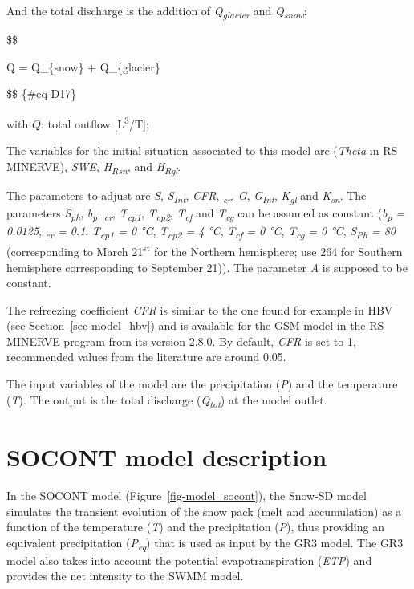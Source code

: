 \documentclass[
  letterpaper,
  DIV=11,
  numbers=noendperiod]{scrreprt}
\begin{document}
And the total discharge is the addition of
\emph{Q\textsubscript{glacier}} and \emph{Q\textsubscript{snow}}:

\$\$

Q = Q\_\{snow\} + Q\_\{glacier\}

\$\$ \{\#eq-D17\}

with \(Q\): total outflow {[}L\textsuperscript{3}/T{]};

The variables for the initial situation associated to this model are
\theta (\emph{Theta} in RS MINERVE), \emph{SWE},
\emph{H\textsubscript{Rsn}}, and \emph{H\textsubscript{Rgl}}.

The parameters to adjust are \emph{S}, \emph{S\textsubscript{Int}},
\emph{CFR}, \emph{\theta\textsubscript{cr}}, \emph{G},
\emph{G\textsubscript{Int}}, \emph{K\textsubscript{gl}} and
\emph{K\textsubscript{sn}}. The parameters \emph{S\textsubscript{ph}},
\emph{b\textsubscript{p}}, \emph{\theta\textsubscript{cr}},
\emph{T\textsubscript{cp1}}, \emph{T\textsubscript{cp2}},
\emph{T\textsubscript{cf}} and \emph{T\textsubscript{cg}} can be assumed
as constant (\emph{b\textsubscript{p} = 0.0125},
\emph{\theta\textsubscript{cr} = 0.1}, \emph{T\textsubscript{cp1} = 0
°C}, \emph{T\textsubscript{cp2} = 4 °C}, \emph{T\textsubscript{cf} = 0
°C}, \emph{T\textsubscript{cg} = 0 °C}, \emph{S\textsubscript{Ph} = 80}
(corresponding to March 21\textsuperscript{st} for the Northern
hemisphere; use 264 for Southern hemisphere corresponding to September
21)). The parameter \emph{A} is supposed to be constant.

The refreezing coefficient \emph{CFR} is similar to the one found for
example in HBV (see Section~\ref{sec-model_hbv}) and is available for
the GSM model in the RS MINERVE program from its version 2.8.0. By
default, \emph{CFR} is set to 1, recommended values from the literature
are around 0.05.

The input variables of the model are the precipitation (\emph{P}) and
the temperature (\emph{T}). The output is the total discharge
(\emph{Q\textsubscript{tot}}) at the model outlet.

\hypertarget{sec-model_socont}{%
\chapter{SOCONT model description}\label{sec-model_socont}}

In the SOCONT model (Figure~\ref{fig-model_socont}), the Snow-SD model
simulates the transient evolution of the snow pack (melt and
accumulation) as a function of the temperature (\emph{T}) and the
precipitation (\emph{P}), thus providing an equivalent precipitation
(\emph{P\textsubscript{eq}}) that is used as input by the GR3 model. The
GR3 model also takes into account the potential evapotranspiration
(\emph{ETP}) and provides the net intensity to the SWMM model.
\end{document}
